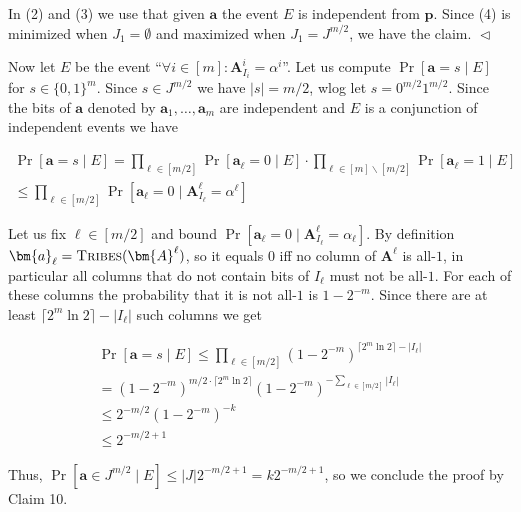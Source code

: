 \documentclass[10pt,a4paper]{article}
\begin{document}
In (2) and (3) we use that given $\bm{a}$ the event $E$ is
independent from $\bm{p}$. Since (4) is minimized when $J_{1}=\emptyset$ and
maximized when $J_{1}=J^{m/2}$, we have the claim.
$\vartriangleleft$\par




Now let $E$ be the event “$\forall i\in[m]\colon\bm{A}^{i}_{I_{i}}=\alpha^{i}$”.
Let us compute $\Pr[\bm{a}=s\mid E]$ for $s\in\{0,1\}^{m}$. Since $s\in J^{m/2}$ we have $|s|=m/2$, wlog let $s=0^{m/2}1^{m/2}$. Since the bits of $\bm{a}$ denoted by $\bm{a}_{1},\dots,\bm{a}_{m}$ are independent and $E$ is a conjunction of independent events we have\par


\[\begin{gathered}
\displaystyle\Pr[\bm{a}=s\mid E] \displaystyle=\prod_{\ell\in[m/2]}\Pr[\bm{a}_{\ell}=0\mid E]\cdot\prod_{\ell\in[m]\smallsetminus[m/2]}\Pr[\bm{a}_{\ell}=1\mid E] \\
\displaystyle\leq\prod_{\ell\in[m/2]}\Pr[\bm{a}_{\ell}=0\mid\bm{A}^{\ell}_{I_{\ell}}=\alpha^{\ell}]
\end{gathered}\]


Let us fix $\ell\in[m/2]$ and bound $\Pr[\bm{a}_{\ell}=0\mid\bm{A}^{\ell}_{I_{\ell}}=\alpha_{\ell}]$. By definition $\bm{a}_{\ell}=\textsc{Tribes}(\bm{A}^{\ell})$, so it equals $0$ iff no column of $\bm{A}^{\ell}$ is all-$1$, in particular all columns that do not contain bits of $I_{\ell}$ must not be all-$1$. For each of these columns the probability that it is not all-$1$ is $1-2^{-m}$. Since there are at least $\lceil 2^{m}\ln 2\rceil-|I_{\ell}|$ such columns we get\par


\[\begin{gathered}
\displaystyle\Pr[\bm{a}=s\mid E] \displaystyle\leq\prod_{\ell\in[m/2]}(1-2^{-m})^{\lceil 2^{m}\ln 2\rceil-|I_{\ell}|} \\
\displaystyle=(1-2^{-m})^{m/2\cdot\lceil 2^{m}\ln 2\rceil}(1-2^{-m})^{-\sum_{\ell\in[m/2]}|I_{\ell}|} \\
\displaystyle\leq 2^{-m/2}(1-2^{-m})^{-k} \\
\displaystyle\leq 2^{-m/2+1}
\end{gathered}\]


Thus, $\Pr[\bm{a}\in J^{m/2}\mid E]\leq|J|2^{-m/2+1}=k2^{-m/2+1}$, so we conclude the proof by Claim 10.\par
\end{document}
